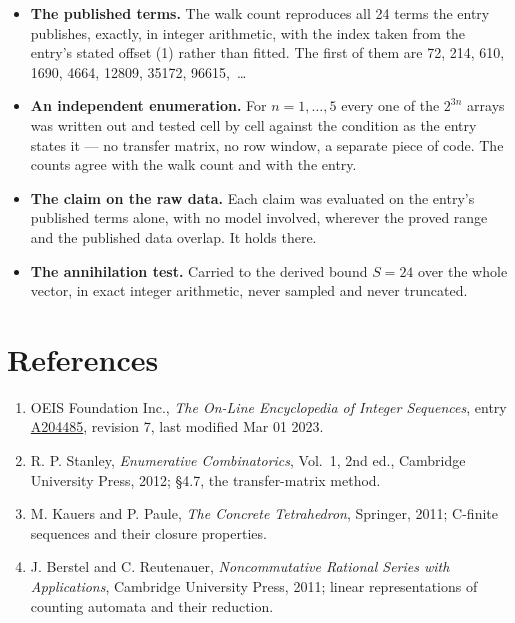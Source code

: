 \documentclass[11pt]{article}
\theoremstyle{definition}
\begin{document}
\begin{itemize}

\item {\bfseries The published terms.} The walk count reproduces all 24 terms the entry publishes, exactly, in integer arithmetic, with the index taken from the entry's stated offset (1) rather than fitted. The first of them are 72, 214, 610, 1690, 4664, 12809, 35172, 96615,~\dots

\item {\bfseries An independent enumeration.} For $n = 1,\dots,5$ every one of the $2^{3n}$ arrays was written out and tested cell by cell against the condition as the entry states it --- no transfer matrix, no row window, a separate piece of code. The counts agree with the walk count and with the entry.

\item {\bfseries The claim on the raw data.} Each claim was evaluated on the entry's published terms alone, with no model involved, wherever the proved range and the published data overlap. It holds there.

\item {\bfseries The annihilation test.} Carried to the derived bound $S = 24$ over the whole vector, in exact integer arithmetic, never sampled and never truncated.

\end{itemize}

\section{References}

\begin{enumerate}

\item OEIS Foundation Inc., \emph{The On-Line Encyclopedia of Integer Sequences}, entry \href{https://oeis.org/A204485}{A204485}, revision 7, last modified Mar 01 2023.

\item R. P. Stanley, \emph{Enumerative Combinatorics}, Vol.~1, 2nd ed., Cambridge University Press, 2012; \S4.7, the transfer-matrix method.

\item M. Kauers and P. Paule, \emph{The Concrete Tetrahedron}, Springer, 2011; C-finite sequences and their closure properties.

\item J. Berstel and C. Reutenauer, \emph{Noncommutative Rational Series with Applications}, Cambridge University Press, 2011; linear representations of counting automata and their reduction.

\end{enumerate}
\end{document}
